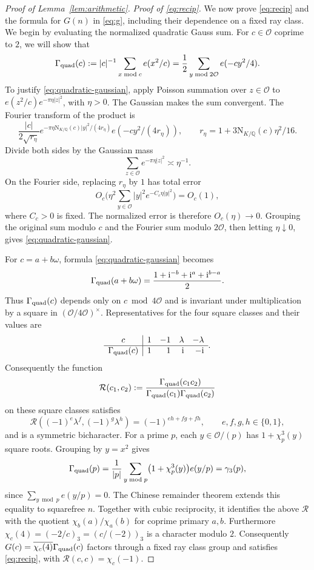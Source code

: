 \documentclass[11pt,a4paper]{article}
\numberwithin{equation}{section}
\numberwithin{figure}{section}
\theoremstyle{definition}
\theoremstyle{remark}
\newcommand{\Q}{\mathbb Q}
\newcommand{\NK}{\mathrm N_{K/\Q}}
\newcommand{\OO}{\mathcal O}
\begin{document}
\begin{proof}[Proof of Lemma~\ref{lem:arithmetic}]
\par\noindent\textit{Proof of \eqref{eq:recip}.}\quad
We now prove \eqref{eq:recip} and the formula for $G(n)$ in
\eqref{eq:g}, including their dependence on a fixed ray class.
We begin by evaluating the normalized quadratic Gauss sum.
For $c\in\OO$ coprime to $2$, we will show that
\begin{equation}\label{eq:quadratic-gaussian}
 \Gamma_{\rm quad}(c):=|c|^{-1}\sum_{x\bmod c}e(x^2/c)
       =\frac12\sum_{y\bmod2\OO}e(-cy^2/4).
\end{equation}
To justify \eqref{eq:quadratic-gaussian}, apply Poisson summation over
$z\in\OO$ to $e(z^2/c)e^{-\pi\eta|z|^2}$, with $\eta>0$.
The Gaussian makes the sum convergent. The Fourier transform of the product is
\[
 \frac{|c|}{2\sqrt{r_\eta}}
 e^{-\pi\eta \NK(c)|y|^2/(4r_\eta)}e(-cy^2/(4r_\eta)),
 \qquad r_\eta=1+3\NK(c)\eta^2/16.
\]
Divide both sides by the Gaussian mass
\[
 \sum_{z\in\OO}e^{-\pi\eta|z|^2}\asymp\eta^{-1}.
\]
On the Fourier side, replacing $r_\eta$ by $1$ has total error
\[
 O_c\!\biggl(\eta^2\sum_{y\in\OO}|y|^2e^{-C_c\eta|y|^2}\biggr)
 =O_c(1),
\]
where $C_c>0$ is fixed. The normalized error is therefore
$O_c(\eta)\to0$. Grouping the original sum modulo $c$ and the
Fourier sum modulo $2\OO$, then letting $\eta\downarrow0$, gives
\eqref{eq:quadratic-gaussian}.

For $c=a+b\omega$, formula \eqref{eq:quadratic-gaussian} becomes
\[
 \Gamma_{\rm quad}(a+b\omega)=\frac{1+\mathrm i^{-b}+\mathrm i^a+\mathrm i^{b-a}}2.
\]
Thus $\Gamma_{\rm quad}(c)$ depends only on $c\bmod4\OO$ and is invariant under
multiplication by a square in $(\OO/4\OO)^\times$. Representatives
for the four square classes and their values are
\[
 \begin{array}{c|rrrr}
 c&1&-1&\lambda&-\lambda\\ \hline
 \Gamma_{\rm quad}(c)&1&1&\mathrm i&-\mathrm i
 \end{array}.
\]
Consequently the function
\[
 \mathcal R(c_1,c_2):=\frac{\Gamma_{\rm quad}(c_1c_2)}{\Gamma_{\rm quad}(c_1)\Gamma_{\rm quad}(c_2)}
\]
on these square classes satisfies
\[
 \mathcal R((-1)^e\lambda^f,(-1)^g\lambda^h)=(-1)^{eh+fg+fh},
 \qquad e,f,g,h\in\{0,1\},
\]
and is a symmetric bicharacter.
For a prime $p$, each $y\in\OO/(p)$ has $1+\chi_p^3(y)$ square roots.
Grouping by $y=x^2$ gives
\[
 \Gamma_{\rm quad}(p)
 =\frac1{|p|}\sum_{y\bmod p}\bigl(1+\chi_p^3(y)\bigr)e(y/p)
 =\gamma_3(p),
\]
since $\sum_{y\bmod p}e(y/p)=0$.
The Chinese remainder theorem extends this equality to squarefree
$n$. Together with cubic reciprocity, it identifies the above $\mathcal R$
with the quotient $\chi_b(a)/\chi_a(b)$ for coprime primary $a,b$.
Furthermore $\chi_c(4)=(-2/c)_3=(c/(-2))_3$ is a character modulo
$2$. Consequently $G(c)=\overline{\chi_c(4)}\Gamma_{\rm quad}(c)$ factors through a fixed ray class group
and satisfies \eqref{eq:recip}, with $\mathcal R(c,c)=\chi_c(-1)$.


\end{proof}
\end{document}
